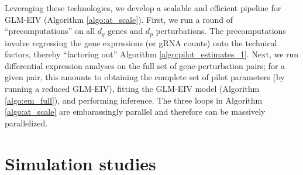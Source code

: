 \documentclass[11pt]{article}
\begin{document}
Leveraging these technologies, we develop a scalable and efficient pipeline for GLM-EIV (Algorithm \ref{algo:at_scale}). First, we run a round of ``precomputations'' on all $d_g$ genes and $d_p$ perturbations. The precomputations involve regressing the gene expressions (or gRNA counts) onto the technical factors, thereby ``factoring out'' Algorithm \ref{algo:pilot_estimates_1}. Next, we run differential expression analyses on the full set of gene-perturbation pairs; for a given pair, this amounts to obtaining the complete set of pilot parameters (by running a reduced GLM-EIV), fitting the GLM-EIV model (Algorithm \ref{algo:em_full}), and performing inference. The three loops in Algorithm \ref{algo:at_scale} are embarassingly parallel and therefore can be massively parallelized. 


\section{Simulation studies}\label{sec:simulation}
\end{document}
